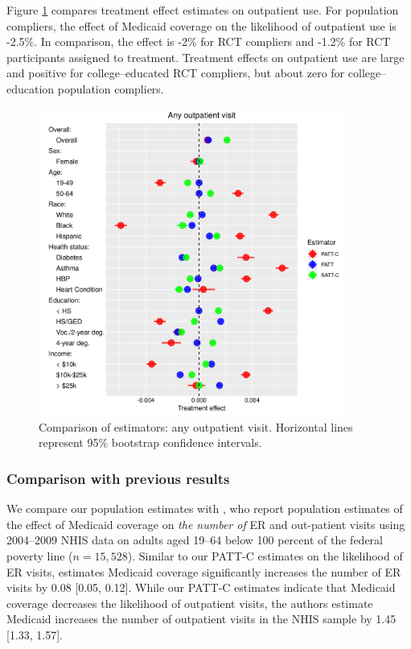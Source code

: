 \documentclass[hidelinks,12pt]{article}
\begin{document}
{Figure \ref{fig:any-out-plot} compares treatment effect estimates on outpatient use. For population compliers, the effect of Medicaid coverage on the likelihood of outpatient use is -2.5\%. In comparison, the effect is -2\% for RCT compliers and -1.2\% for RCT participants assigned to treatment. Treatment effects on outpatient use are large and positive for college--educated RCT compliers, but about zero for college--education population compliers. 
%

\begin{figure}[htbp]
\begin{center}
\includegraphics[width = 0.9\textwidth]{any-out-plot}
    \caption{Comparison of estimators: any outpatient visit. Horizontal lines represent 95\% bootstrap confidence intervals.\label{fig:any-out-plot}}
\end{center}
\end{figure}

{\color{red}
\subsubsection{Comparison with previous results} \label{results-compare}
}
We compare our population estimates with \citet{finkelstein2012}, who report population estimates of the effect of Medicaid coverage on \emph{the number of} ER and out-patient visits using 2004--2009 NHIS data on adults aged 19--64 below 100 percent of the federal poverty line ($n=15,528$). Similar to our PATT-C estimates on the likelihood of ER visits, \citet{finkelstein2012} estimates Medicaid coverage significantly increases the number of ER visits by 0.08 [0.05, 0.12]. While our PATT-C estimates indicate that Medicaid coverage decreases the likelihood of outpatient visits, the authors estimate Medicaid increases the number of outpatient visits in the NHIS sample by 1.45 [1.33, 1.57]. 

}
\end{document}

